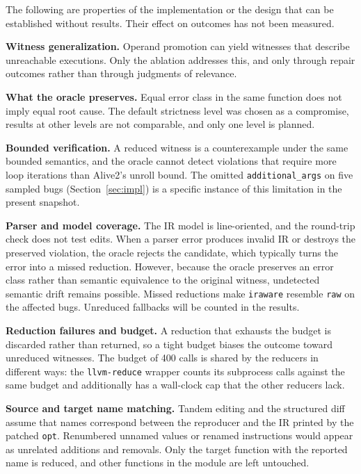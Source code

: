 \documentclass[conference]{IEEEtran}
\newcommand{\cn}[1]{\texttt{#1}}   %
\begin{document}
The following are properties of the implementation or the design that can be established without results. Their effect on outcomes has not been measured.

\textbf{Witness generalization.} Operand promotion can yield witnesses that describe unreachable executions. Only the ablation addresses this, and only through repair outcomes rather than through judgments of relevance.

\textbf{What the oracle preserves.} Equal error class in the same function does not imply equal root cause. The default strictness level was chosen as a compromise, results at other levels are not comparable, and only one level is planned.

\textbf{Bounded verification.} A reduced witness is a counterexample under the same bounded semantics, and the oracle cannot detect violations that require more loop iterations than Alive2's unroll bound. The omitted \texttt{additional\_args} on five sampled bugs (Section~\ref{sec:impl}) is a specific instance of this limitation in the present snapshot.

\textbf{Parser and model coverage.} The IR model is line-oriented, and the round-trip check does not test edits. When a parser error produces invalid IR or destroys the preserved violation, the oracle rejects the candidate, which typically turns the error into a missed reduction. However, because the oracle preserves an error class rather than semantic equivalence to the original witness, undetected semantic drift remains possible. Missed reductions make \cn{iraware} resemble \cn{raw} on the affected bugs. Unreduced fallbacks will be counted in the results.

\textbf{Reduction failures and budget.} A reduction that exhausts the budget is discarded rather than returned, so a tight budget biases the outcome toward unreduced witnesses. The budget of 400 calls is shared by the reducers in different ways: the \texttt{llvm-reduce} wrapper counts its subprocess calls against the same budget and additionally has a wall-clock cap that the other reducers lack.

\textbf{Source and target name matching.} Tandem editing and the structured diff assume that names correspond between the reproducer and the IR printed by the patched \texttt{opt}. Renumbered unnamed values or renamed instructions would appear as unrelated additions and removals. Only the target function with the reported name is reduced, and other functions in the module are left untouched.
\end{document}

